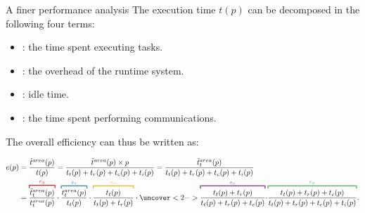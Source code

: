 \begin{frame}{A finer performance analysis}
  The execution time $t(p)$ can be decomposed in the following four
  terms:
  \begin{itemize}
  \item<1-> : the time spent executing tasks.
  \item<1-> : the overhead of the runtime system.
  \item<1-> : idle time.
  \item<2-> : the time spent performing communications.
  \end{itemize}

  The overall efficiency can thus be written as:
  
  {\tiny
\begin{align*}
  e(p) & = \frac{\tilde{t}^{area}(p)}{t(p)} =  \frac{\tilde{t}^{area}(p) \times p }{ t_t(p) + t_r(p) + t_c(p) + t_i(p) } = \frac{ \tilde{t}^{area}_t(p) }{ t_t(p) + t_r(p) + t_c(p) + t_i(p) } \\
  & =  \mre{\overbracket{\mbk{\frac{ \tilde{t}^{area}_t(p) }{ t^{area}_t(p) }}}^{e_g}}\cdot 
  \mbl{\overbracket{\mbk{\frac{ t^{area}_t(p) }{ t_t(p) }}}^{e_{t}}}\cdot  
  \mye{\overbracket{\mbk{\frac{ t_t(p) }{ t_t(p)+t_r(p) }}}^{e_r}}\cdot
  \uncover<2->{\mbp{\overbracket{\mbk{\frac{ t_t(p)+t_r(p) }{t_t(p)+t_r(p)+ t_c(p)}}}^{e_c}}\cdot}
  \mgr{\overbracket{\mbk{\frac{ t_t(p)+t_r(p)+ t_c(p) }{ t_t(p) + t_r(p) + t_c(p) + t_i(p) }}}^{e_p}}.
\end{align*}
 }

  

\end{frame}
